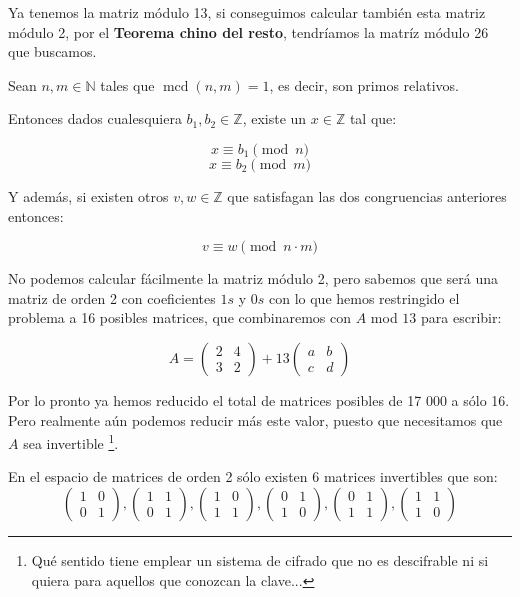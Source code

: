\begin{example}
Ya tenemos la matriz módulo 13, si conseguimos calcular también esta matriz módulo 2, por el \textbf{Teorema chino del resto}, tendríamos la matríz módulo 26 que buscamos.

\begin{theorem}
Sean $n,m \in \mathbb{N}$ tales que $ \operatorname{mcd}(n, m) = 1 $, es decir, son primos relativos.

Entonces dados cualesquiera $b_1,b_2 \in \mathbb{Z}$, existe un $x \in \mathbb{Z}$ tal que:

\[x \equiv b_1 \pmod n\]
\[x \equiv b_2 \pmod m\]

Y además, si existen otros $v,w \in \mathbb{Z}$ que satisfagan las dos congruencias anteriores entonces:

\[v \equiv w \pmod {n \cdot m} \]
\end{theorem}

No podemos calcular fácilmente la matriz módulo 2, pero sabemos que será una matriz de orden 2 con coeficientes $1s$ y $0s$ con lo que hemos restringido el problema a 16 posibles matrices, que combinaremos con $A$ mod $13$ para escribir:

\[A = \left( \begin{array}{cc}
2 & 4 \\
3 & 2  \end{array} \right) + 13 \left( \begin{array}{cc}
a & b \\
c & d  \end{array} \right)\]

Por lo pronto ya hemos reducido el total de matrices posibles de 17 000 a sólo 16. Pero realmente aún podemos reducir más este valor, puesto que necesitamos que $A$ sea invertible \footnote{Qué sentido tiene emplear un sistema de cifrado que no es descifrable ni si quiera para aquellos que conozcan la clave...}.

En el espacio de matrices de orden 2 sólo existen 6 matrices invertibles que son:
\[\left( \begin{array}{cc}
1 & 0 \\
0 & 1  \end{array} \right),\left( \begin{array}{cc}
1 & 1 \\
0 & 1  \end{array} \right),\left( \begin{array}{cc}
1 & 0 \\
1 & 1  \end{array} \right),\left( \begin{array}{cc}
0 & 1 \\
1 & 0  \end{array} \right),\left( \begin{array}{cc}
0 & 1 \\
1 & 1  \end{array} \right),\left( \begin{array}{cc}
1 & 1 \\
1 & 0  \end{array} \right)\]


\end{example}
